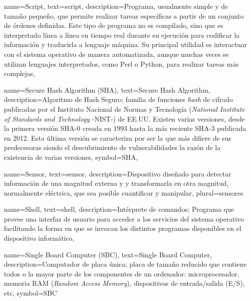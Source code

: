 {
    name={Script},
    text={script},
    description={Programa, usualmente simple y de tamaño pequeño, que permite realizar tareas específicas a partir de un conjunto de órdenes definidas. Este tipo de programa no es compilado, sino que es interpretado línea a línea en tiempo real durante su ejecución para codificar la información y traducirla a lenguaje máquina. Su principal utilidad es interactuar con el sistema operativo de manera automatizada, aunque muchas veces se utilizan lenguajes interpretados, como Perl o Python, para realizar tareas más complejas},
}

{
    name={Secure Hash Algorithm (SHA)},
    text={Secure Hash Algorithm},
    description={Algoritmo de Hash Seguro; familia de funciones \textit{hash} de cifrado 
    publicadas por el Instituto Nacional de Normas y Tecnología (\textit{National Institute of Standards and Technology} -NIST-)​ de EE.UU. Existen varias versiones, desde la primera versión SHA-0 creada en 1993 hasta la más reciente SHA-3 publicada en 2012. Esta  última versión se caracteriza por ser la que más difiere de sus predecesoras siendo el descubrimiento de vulnerabilidades la razón de la existencia de varias versiones},
    symbol={SHA},
}

{
    name={Sensor},
    text={sensor},
    description={Dispositivo diseñado para detectar información de una magnitud externa y y transformarla en otra magnitud, normalmente eléctrica, que sea posible cuantificar y manipular},
    plural={sensores}
}

{
    name={Shell},
    text={shell},
    description={Intérprete de comandos; Programa que provee una interfaz de usuario para acceder a los servicios del sistema operativo facilitando la forma en que se invocan los distintos programas disponibles en el dispositivo informático},
}

{
    name={Single Board Computer (SBC)},
    text={Single Board Computer},
    description={Computador de placa única; placa de tamaño reducido que contiene todos o la mayor parte de los componentes de un ordenador: microprocesador, memoria RAM (\textit{Random Access Memory}), dispositivos de entrada/salida (E/S), etc},
    symbol={SBC}
}

